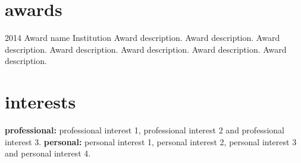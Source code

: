 \documentclass[]{cv-style}          %
\begin{document}

\section{awards}

\begin{entrylist}
\entry
{2014}
{Award name}
{Institution}
{Award description. Award description. Award description. Award description. Award description. Award description. Award description. }
\end{entrylist}


\section{interests}
  \vspace{-0.2cm}

\textbf{professional:} professional interest 1, professional interest 2 and professional interest 3. \textbf{personal:} personal interest 1, personal interest 2, personal interest 3 and personal interest 4.

\end{document}

